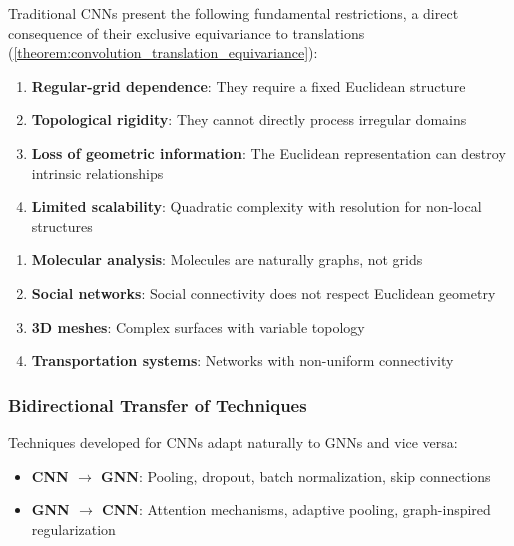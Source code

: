 \begin{remark}\label{rem:limitaciones_estructurales_cnns}
Traditional \glspl{CNN} present the following fundamental restrictions, a direct consequence of their exclusive equivariance to translations (\autoref{theorem:convolution_translation_equivariance}):
\begin{enumerate}
    \item \textbf{Regular-grid dependence}: They require a fixed Euclidean structure
    \item \textbf{Topological rigidity}: They cannot directly process irregular domains
    \item \textbf{Loss of geometric information}: The Euclidean representation can destroy intrinsic relationships
    \item \textbf{Limited scalability}: Quadratic complexity with resolution for non-local structures
\end{enumerate}
\end{remark}

\begin{example}
\leavevmode
\begin{enumerate}
    \item \textbf{Molecular analysis}: Molecules are naturally graphs, not grids
    \item \textbf{Social networks}: Social connectivity does not respect Euclidean geometry
    \item \textbf{3D meshes}: Complex surfaces with variable topology
    \item \textbf{Transportation systems}: Networks with non-uniform connectivity
\end{enumerate}
\end{example}

\subsubsection{Bidirectional Transfer of Techniques}

\begin{proposition}
Techniques developed for \glspl{CNN} adapt naturally to \glspl{GNN} and vice versa:
\begin{itemize}
    \item \textbf{CNN $\rightarrow$ GNN}: Pooling, dropout, batch normalization, skip connections
    \item \textbf{GNN $\rightarrow$ CNN}: Attention mechanisms, adaptive pooling, graph-inspired regularization
\end{itemize}
\end{proposition}

